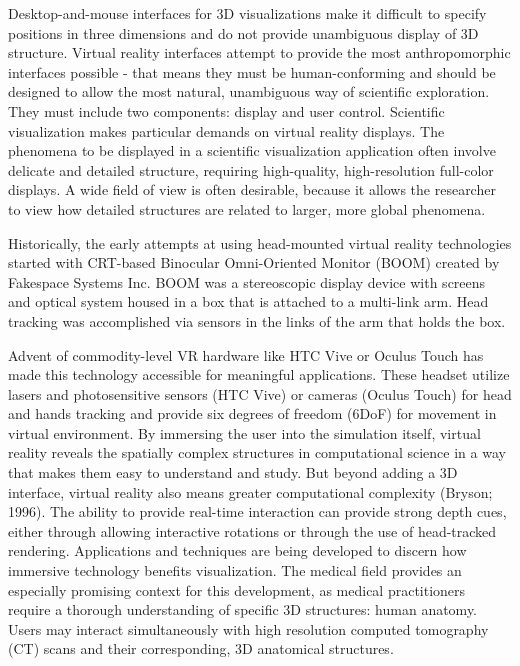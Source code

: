Desktop-and-mouse interfaces for 3D visualizations make it difficult to specify positions in three dimensions and do not provide unambiguous display of 3D structure. Virtual reality interfaces attempt to provide the most anthropomorphic interfaces possible - that means they must be human-conforming and should be designed to allow the most natural, unambiguous way of scientific exploration. They must include two components: display and user control. Scientific visualization makes particular demands on virtual reality displays. The phenomena to be displayed in a scientific visualization application often involve delicate and detailed structure, requiring high-quality, high-resolution full-color displays. A wide field of view is often desirable, because it allows the researcher to view how detailed structures are related to larger, more global phenomena.

Historically, the early attempts at using head-mounted virtual reality technologies started with CRT-based Binocular Omni-Oriented Monitor (BOOM) created by Fakespace Systems Inc. BOOM was a stereoscopic display device with screens and optical system housed in a box that is attached to a multi-link arm. Head tracking was accomplished via sensors in the links of the arm that holds the box.

Advent of commodity-level VR hardware like HTC Vive or Oculus Touch has made this technology accessible for meaningful applications. These headset utilize lasers and photosensitive sensors (HTC Vive) or cameras (Oculus Touch) for head and hands tracking and provide six degrees of freedom (6DoF) for movement in virtual environment. By immersing the user into the simulation itself, virtual reality reveals the spatially complex structures in computational science in a way that makes them easy to understand and study. But beyond adding a 3D interface, virtual reality also means greater computational complexity (Bryson; 1996). The ability to provide real-time interaction can provide strong depth cues, either through allowing interactive rotations or through the use of head-tracked rendering. Applications and techniques are being developed to discern how immersive technology benefits visualization. The medical field provides an especially promising context for this development, as medical practitioners require a thorough understanding of specific 3D structures: human anatomy. Users may interact simultaneously with high resolution computed tomography (CT) scans and their corresponding, 3D anatomical structures.


